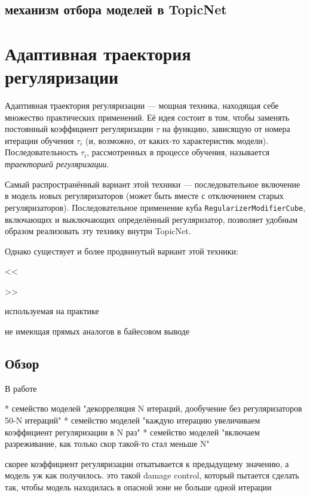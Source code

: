 \subsection{механизм отбора моделей в TopicNet}


\section{Адаптивная траектория регуляризации}

Адаптивная траектория регуляризации --- мощная техника, находящая себе множество практических применений. Её идея состоит в том, чтобы заменять постоянный коэффициент регуляризации $\tau$ на функцию, зависящую от номера итерации обучения $\tau_i$ (и, возможно, от каких-то характеристик модели). Последовательность $\tau_i$, рассмотренных в процессе обучения, называется \textit{траекторией регуляризации}.

Самый распространённый вариант этой техники --- последовательное включение в модель новых регуляризаторов (может быть вместе с отключением старых регуляризаторов). Последовательное применение куба \texttt{RegularizerModifierCube}, включающих и выключающих определённый регуляризатор, позволяет удобным образом реализовать эту технику внутри TopicNet.

Однако существует и более продвинутый вариант этой техники:

<<

>>

используемая на практике

не имеющая прямых аналогов в байесовом выводе


\subsection{Обзор}


В работе \cite{plavin}


\cite{ianina2019regularized}
\cite{popov_hier}

* семейство моделей "декорреляция N итераций, дообучение без регуляризаторов 50-N итераций"
* семейство моделей "каждую итерацию увеличиваем коэффициент регуляризации в N раз"
* семейство моделей "включаем разреживание, как только скор такой-то стал меньше N"

скорее коэффициент регуляризации откатывается к предыдущему значению, а модель уж как получилось.
это такой damage control, который пытается сделать так, чтобы модель находилась в опасной зоне не больше одной итерации





